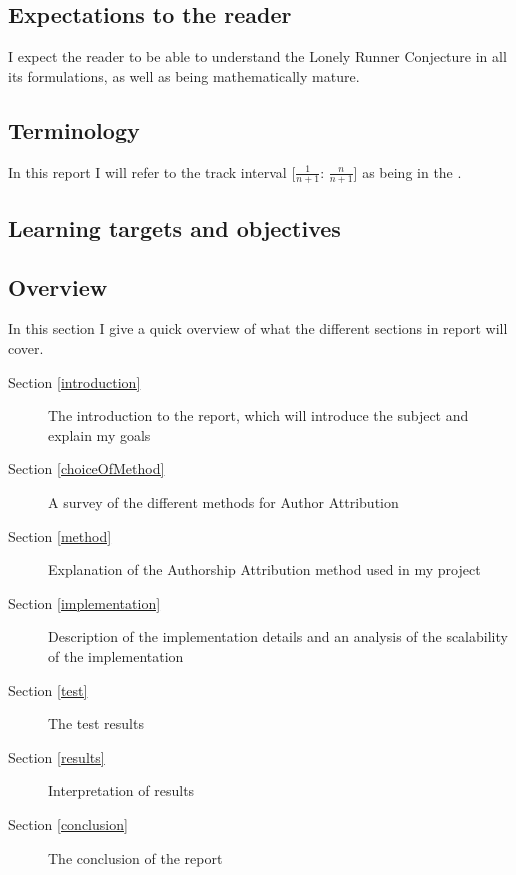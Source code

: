 \subsection{Expectations to the reader}
\label{expectations}
I expect the reader to be able to understand the Lonely Runner Conjecture in all its formulations, as well as being mathematically mature.

\subsection{Terminology}
\label{Termonolgy}
In this report I will refer to the track interval [$\frac{1}{n + 1}$: $\frac{n}{n+1}$] as being in the \zone.

\subsection{Learning targets and objectives}
\label{learning}

\subsection{Overview}

In this section I give a quick overview of what the different sections in report will cover.
\begin{description}
\item[Section \ref{introduction}] The introduction to the report, which will introduce the subject and explain my goals
\item[Section \ref{choiceOfMethod}] A survey of the different methods for Author Attribution  
\item[Section \ref{method}] Explanation of the Authorship Attribution method used in my project
\item[Section \ref{implementation}] Description of the implementation details and an analysis of the scalability of the implementation
\item[Section \ref{test}] The test results
\item[Section \ref{results}] Interpretation of results
\item[Section \ref{conclusion}] The conclusion of the report  
\end{description}
